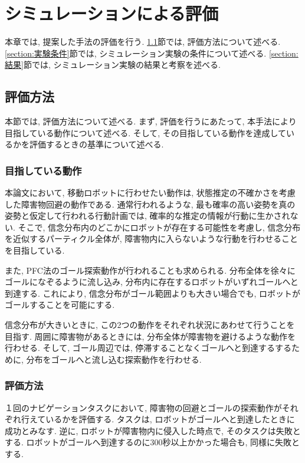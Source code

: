 \chapter{シミュレーションによる評価} \label{chapter:evaluate}
本章では, 提案した手法の評価を行う. 
\ref{section:評価方法}節では, 評価方法について述べる. 
\ref{section:実験条件}節では, シミュレーション実験の条件について述べる. 
\ref{section:結果}節では, シミュレーション実験の結果と考察を述べる. 

\section{評価方法} \label{section:評価方法}
本節では, 評価方法について述べる. 
まず, 評価を行うにあたって, 本手法により目指している動作について述べる. 
そして, その目指している動作を達成しているかを評価するときの基準について述べる. 

\subsection{目指している動作}
本論文において, 移動ロボットに行わせたい動作は, 状態推定の不確かさを考慮した障害物回避の動作である. 
通常行われるような, 最も確率の高い姿勢を真の姿勢と仮定して行われる行動計画では, 確率的な推定の情報が行動に生かされない. 
そこで, 信念分布内のどこかにロボットが存在する可能性を考慮し, 
信念分布を近似するパーティクル全体が, 障害物内に入らないような行動を行わせることを目指している. 

また, PFC法のゴール探索動作が行われることも求められる. 
分布全体を徐々にゴールになぞるように流し込み, 分布内に存在するロボットがいずれゴールへと到達する. 
これにより, 信念分布がゴール範囲よりも大きい場合でも, ロボットがゴールすることを可能にする. 

信念分布が大きいときに, この2つの動作をそれぞれ状況にあわせて行うことを目指す. 
周囲に障害物があるときには, 分布全体が障害物を避けるような動作を行わせる. 
そして, ゴール周辺では, 停滞することなくゴールへと到達するするために, 分布をゴールへと流し込む探索動作を行わせる. 

\subsection{評価方法}
１回のナビゲーションタスクにおいて, 障害物の回避とゴールの探索動作がそれぞれ行えているかを評価する. 
タスクは, ロボットがゴールへと到達したときに成功とみなす. 
逆に, ロボットが障害物内に侵入した時点で, そのタスクは失敗とする. 
ロボットがゴールへ到達するのに300秒以上かかった場合も, 同様に失敗とする. 


